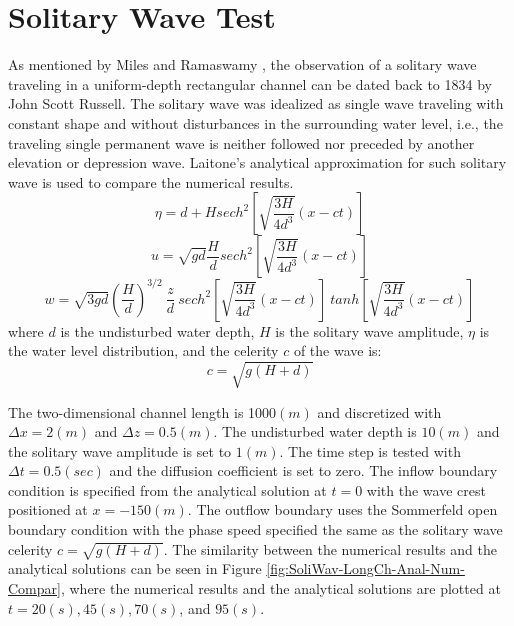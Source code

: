 \normalsize
\section{Solitary Wave Test}
As mentioned by Miles \cite{Miles1980} and Ramaswamy \cite{Ramaswamy1990}, the observation of a solitary wave traveling in a uniform-depth rectangular channel can be dated back to 1834 by John Scott Russell. The solitary wave was idealized as single wave traveling with constant shape and without disturbances in the surrounding water level, i.e., the traveling single permanent wave is neither followed nor preceded by another elevation or depression wave.
Laitone's analytical approximation for such solitary wave \cite{Laitone1960, Jankowski1999} is used to compare the numerical results.
\begin{equation}
\eta = d + Hsech^2[\sqrt{\frac{3H}{4d^3}}(x-ct)]
\end{equation}
\begin{equation}
u = \sqrt{gd}\frac{H}{d}sech^2[\sqrt{\frac{3H}{4d^3}}(x-ct)]
\end{equation}
\begin{equation}
w = \sqrt{3gd}(\frac{H}{d})^{3/2}\ \frac{z}{d} \
sech^2[\sqrt{\frac{3H}{4d^3}}(x-ct)] \
tanh[\sqrt{\frac{3H}{4d^3}}(x-ct)]
\end{equation}
where $d$ is the undisturbed water depth, $H$ is the solitary wave amplitude, $\eta$ is the water level distribution, and the celerity $c$ of the wave is:
\begin{equation}
c=\sqrt{g(H+d)}
\end{equation}

The two-dimensional channel length is 1000$(m)$ and discretized with $\Delta x = 2 (m)$ and $\Delta z = 0.5 (m)$. The undisturbed water depth is $10 (m)$ and the solitary wave amplitude is set to $1 (m)$. The time step is tested with $\Delta t = 0.5(sec)$ and the diffusion coefficient is set to zero.
The inflow boundary condition is specified from the analytical solution at $t=0$ with the wave crest positioned at $x=-150 (m)$. The outflow boundary uses the Sommerfeld open boundary condition \cite{Sommerfeld1949} with the phase speed specified the same as the solitary wave celerity $c=\sqrt{g(H+d)}$. The similarity between the numerical results and the analytical solutions can be seen in Figure \ref{fig:SoliWav-LongCh-Anal-Num-Compar}, where the numerical results and the analytical solutions are plotted at $ t=20(s), 45(s), 70(s)$, and $95(s)$.

